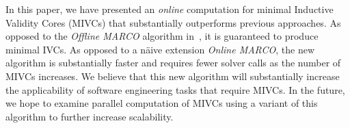 In this paper, we have presented an {\em online} computation for minimal Inductive Validity Cores (MIVCs) that substantially outperforms previous approaches.  As opposed to the {\em Offline MARCO} algorithm in~\cite{Ghass17AllIVCs}, it is guaranteed to produce minimal IVCs.  As opposed to a n\"aive extension {\em Online MARCO}, the new algorithm is substantially faster and requires fewer solver calls as the number of MIVCs increases.  We believe that this new algorithm will substantially increase the applicability of software engineering tasks that require MIVCs.  In the future, we hope to examine parallel computation of MIVCs using a variant of this algorithm to further increase scalability.
